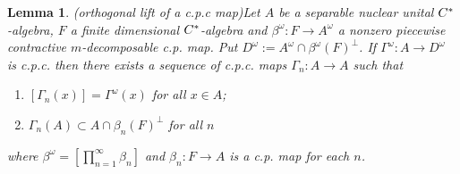 \documentclass[12pt]{amsart}
\theoremstyle{plain}
\newtheorem{lem}[thm]{Lemma}
\theoremstyle{definition}
\numberwithin{equation}{section}
\begin{document}
\begin{lem}(orthogonal lift of a c.p.c map)\label{L:orthogonallift}
Let $A$ be a separable nuclear unital $C\sp*$-algebra, $F$ a finite dimensional $C\sp*$-algebra and $\beta^{\omega}: F \to A^{\omega}$ a nonzero piecewise contractive  $m$-decomposable c.p. map. Put $D^{\omega}:=A^{\omega}\cap \beta^{\omega}(F)^{\perp}$. If $\Gamma^{\omega}: A \to D^{\omega}$ is c.p.c. then there exists a sequence of c.p.c. maps $\Gamma_n: A \to A$ such that 
\begin{enumerate}
\item $ [\Gamma_n(x)]=\Gamma^{\omega}(x)$ for all $x\in A$;
\item $ \Gamma_n(A) \subset A\cap \beta_n(F)^{\perp}$ for all $n$  
\end{enumerate}   
where $\beta^{\omega}=[\prod_{n=1}^{\infty} \beta_n]$ and $\beta_n: F \to A$ is a c.p. map  for each $n$. 
\end{lem}
\end{document}
